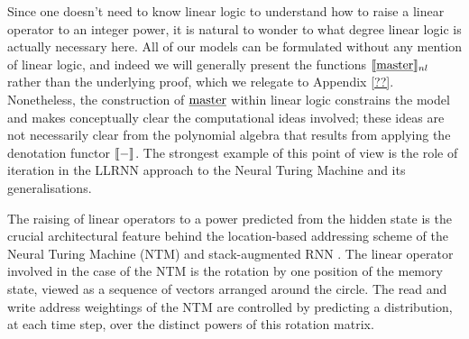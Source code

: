 \documentclass[english,letter paper,12pt,leqno]{article}
\theoremstyle{example}
\numberwithin{equation}{section}
\begin{document}
Since one doesn't need to know linear logic to understand how to raise a linear operator to an integer power, it is natural to wonder to what degree linear logic is actually necessary here. All of our models can be formulated without any mention of linear logic, and indeed we will generally present the functions $\llbracket \underline{\textup{master}} \rrbracket_{nl}$ rather than the underlying proof, which we relegate to Appendix \ref{??}. Nonetheless, the construction of $\underline{\textup{master}}$ within linear logic constrains the model and makes conceptually clear the computational ideas involved; these ideas are not necessarily clear from the polynomial algebra that results from applying the denotation functor $\llbracket - \rrbracket$. The strongest example of this point of view is the role of iteration in the LLRNN approach to the Neural Turing Machine and its generalisations.

The raising of linear operators to a power predicted from the hidden state is the crucial architectural feature behind the location-based addressing scheme of the Neural Turing Machine (NTM) \cite{ntm} and stack-augmented RNN \cite{joulin}. The linear operator involved in the case of the NTM is the rotation by one position of the memory state, viewed as a sequence of vectors arranged around the circle. The read and write address weightings of the NTM are controlled by predicting a distribution, at each time step, over the distinct powers of this rotation matrix.
\end{document}
